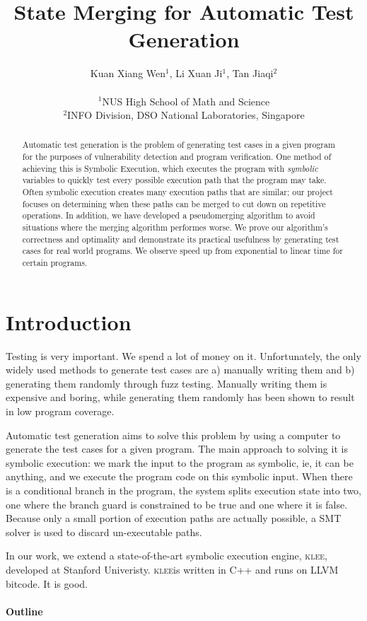 \documentclass[12pt,a4paper]{article}
\title{State Merging for Automatic Test Generation}
\date{}
\author{
Kuan Xiang Wen$^{1}$, Li Xuan Ji$^{1}$, Tan Jiaqi$^{2}$\\
\vspace{1 mm} \\
\small{$^{1}$NUS High School of Math and Science}\\
\small{$^{2}$INFO Division, DSO National Laboratories, Singapore}
}
\newcommand{\klee}{\textsc{klee}}
\begin{document}
\maketitle
\begin{abstract}
Automatic test generation is the problem of generating test cases in a given program for the purposes of vulnerability detection and program verification. One method of achieving this is Symbolic Execution, which executes the program with \emph{symbolic} variables to quickly test every possible execution path that the program may take. Often symbolic execution creates many execution paths that are similar; our project focuses on determining when these paths can be merged to cut down on repetitive operations. In addition, we have developed a pseudomerging algorithm to avoid situations where the merging algorithm performes worse. We prove our algorithm's correctness and optimality and demonstrate its practical usefulness by generating test cases for real world programs. We observe speed up from exponential to linear time for certain programs.
\end{abstract}

\section{Introduction}
Testing is very important. We spend a lot of money on it. Unfortunately, the only widely used methods to generate test cases are a) manually writing them and b) generating them randomly through fuzz testing. Manually writing them is expensive and boring, while generating them randomly has been shown to result in low program coverage. 

Automatic test generation aims to solve this problem by using a computer to generate the test cases for a given program. The main approach to solving it is symbolic execution: we mark the input to the program as symbolic, ie, it can be anything, and we execute the program code on this symbolic input. When there is a conditional branch in the program, the system splits execution state into two, one where the branch guard is constrained to be true and one where it is false. Because only a small portion of execution paths are actually possible, a SMT solver is used to discard un-executable paths. 

In our work, we extend a state-of-the-art symbolic execution engine, \klee, developed at Stanford Univeristy. \klee is written in C++ and runs on LLVM bitcode. It is good.

\paragraph{Outline}
\end{document}
